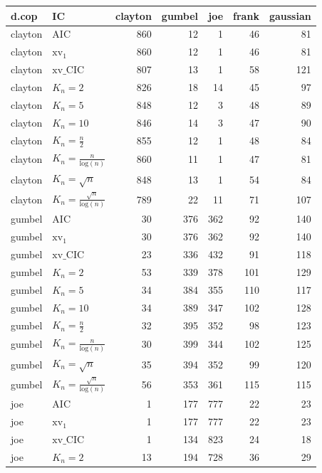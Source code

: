 \begin{table}[htbp]
\centering
\begin{tabular}{llrrrrr}
  \hline
d.cop & IC & clayton & gumbel & joe & frank & gaussian \\ 
  \hline
clayton & AIC & 860 & 12 & 1 & 46 & 81 \\ 
  clayton & $\text{xv}_{1}$ & 860 & 12 & 1 & 46 & 81 \\ 
  clayton & $\text{xv}\_\text{CIC}$ & 807 & 13 & 1 & 58 & 121 \\ 
  clayton & $K_{n}=2$ & 826 & 18 & 14 & 45 & 97 \\ 
  clayton & $K_{n}=5$ & 848 & 12 & 3 & 48 & 89 \\ 
  clayton & $K_{n}=10$ & 846 & 14 & 3 & 47 & 90 \\ 
  clayton & $K_{n}=\tfrac{n}{2}$ & 855 & 12 & 1 & 48 & 84 \\ 
  clayton & $K_{n}=\tfrac{n}{\text{log}(n)}$ & 860 & 11 & 1 & 47 & 81 \\ 
  clayton & $K_{n}=\sqrt{n}$ & 848 & 13 & 1 & 54 & 84 \\ 
  clayton & $K_{n}=\tfrac{\sqrt{n}}{\text{log}(n)}$ & 789 & 22 & 11 & 71 & 107 \\ 
   \hdashline
gumbel & AIC & 30 & 376 & 362 & 92 & 140 \\ 
  gumbel & $\text{xv}_{1}$ & 30 & 376 & 362 & 92 & 140 \\ 
  gumbel & $\text{xv}\_\text{CIC}$ & 23 & 336 & 432 & 91 & 118 \\ 
  gumbel & $K_{n}=2$ & 53 & 339 & 378 & 101 & 129 \\ 
  gumbel & $K_{n}=5$ & 34 & 384 & 355 & 110 & 117 \\ 
  gumbel & $K_{n}=10$ & 34 & 389 & 347 & 102 & 128 \\ 
  gumbel & $K_{n}=\tfrac{n}{2}$ & 32 & 395 & 352 & 98 & 123 \\ 
  gumbel & $K_{n}=\tfrac{n}{\text{log}(n)}$ & 30 & 399 & 344 & 102 & 125 \\ 
  gumbel & $K_{n}=\sqrt{n}$ & 35 & 394 & 352 & 99 & 120 \\ 
  gumbel & $K_{n}=\tfrac{\sqrt{n}}{\text{log}(n)}$ & 56 & 353 & 361 & 115 & 115 \\ 
   \hdashline
joe & AIC & 1 & 177 & 777 & 22 & 23 \\ 
  joe & $\text{xv}_{1}$ & 1 & 177 & 777 & 22 & 23 \\ 
  joe & $\text{xv}\_\text{CIC}$ & 1 & 134 & 823 & 24 & 18 \\ 
  joe & $K_{n}=2$ & 13 & 194 & 728 & 36 & 29 \\ 

\end{tabular}
\end{table}
